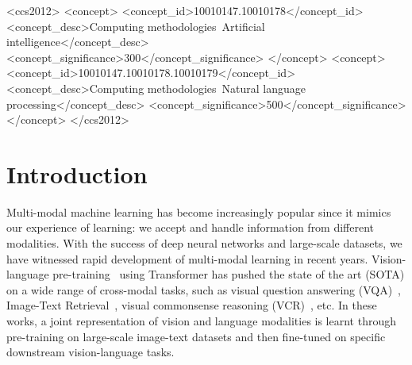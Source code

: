 \documentclass[sigconf,anonymous,review]{acmart}
\begin{document}
\begin{CCSXML}
<ccs2012>
   <concept>
       <concept_id>10010147.10010178</concept_id>
       <concept_desc>Computing methodologies~Artificial intelligence</concept_desc>
       <concept_significance>300</concept_significance>
       </concept>
   <concept>
       <concept_id>10010147.10010178.10010179</concept_id>
       <concept_desc>Computing methodologies~Natural language processing</concept_desc>
       <concept_significance>500</concept_significance>
       </concept>
 </ccs2012>
\end{CCSXML}




\maketitle

\section{Introduction}
\label{sec:intro}

Multi-modal machine learning has become increasingly popular since it mimics our experience of learning: we accept and handle information from different modalities. 
With the success of deep neural networks and large-scale datasets, we have witnessed rapid development of multi-modal learning in recent years.
Vision-language pre-training~\cite{chen2020uniter,li2020oscar,lu2019vilbert,su2019vl} using Transformer has pushed the state of the art (SOTA) on a wide range of cross-modal tasks, such as visual question answering (VQA)~\cite{antol2015vqa}, Image-Text Retrieval~\cite{lin2014microsoft}, visual commonsense reasoning (VCR)~\cite{zellers2019recognition}, etc.
In these works, a joint representation of vision and language modalities is learnt through pre-training on large-scale image-text datasets and then fine-tuned on specific downstream vision-language tasks.
\end{document}
